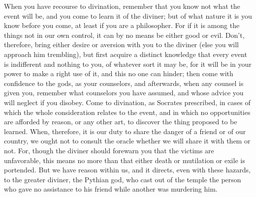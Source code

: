 When you have recourse to divination, remember that you know not
what the event will be, and you come to learn it of the diviner; but
of what nature it is you know before you come, at least if you are
a philosopher. For if it is among the things not in our own control,
it can by no means be either good or evil. Don't, therefore, bring
either desire or aversion with you to the diviner (else you will approach
him trembling), but first acquire a distinct knowledge that every
event is indifferent and nothing to you, of whatever sort it may
be, for it will be in your power to make a right use of it, and this
no one can hinder; then come with confidence to the gods, as your
counselors, and afterwards, when any counsel is given you, remember
what counselors you have assumed, and whose advice you will neglect
if you disobey. Come to divination, as Socrates prescribed, in cases
of which the whole consideration relates to the event, and in which
no opportunities are afforded by reason, or any other art, to discover
the thing proposed to be learned. When, therefore, it is our duty
to share the danger of a friend or of our country, we ought not to
consult the oracle whether we will share it with them or not. For,
though the diviner should forewarn you that the victims are unfavorable,
this means no more than that either death or mutilation or exile is
portended. But we have reason within us, and it directs, even with
these hazards, to the greater diviner, the Pythian god, who cast out
of the temple the person who gave no assistance to his friend while
another was murdering him. 
